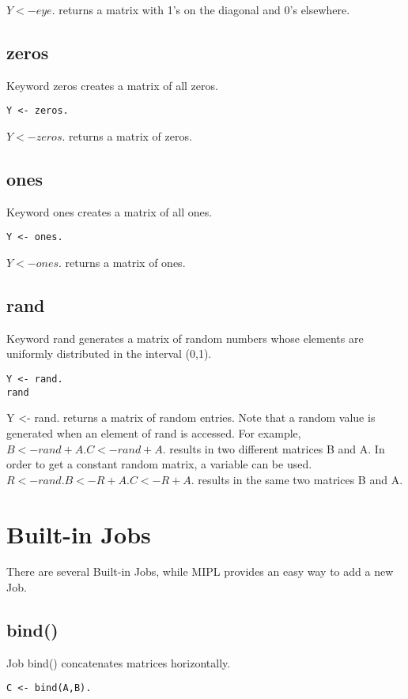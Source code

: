 \documentclass[prodmode,acmtecs]{acmsmall}
\begin{document}
$Y <- eye.$ returns a matrix with 1's on the diagonal and 0's elsewhere.
\medskip

\subsection{zeros}
Keyword zeros creates a matrix of all zeros.
\begin{lstlisting}
Y <- zeros.
\end{lstlisting}

$Y <- zeros.$ returns a matrix of zeros.
\medskip

\subsection{ones}
Keyword ones creates a matrix of all ones.
\begin{lstlisting}
Y <- ones.
\end{lstlisting}

$Y <- ones.$ returns a matrix of ones.
\medskip

\subsection{rand}
Keyword rand generates a matrix of random numbers whose elements are
uniformly distributed in the interval (0,1).
\begin{lstlisting}
Y <- rand.
rand
\end{lstlisting}

Y <- rand. returns a matrix of random entries. Note that a random value
is generated when an element of rand is accessed. For example,
$B <- rand + A. C <- rand + A.$ results in two different matrices B and A.
In order to get a constant random matrix, a variable can be used.
$R <- rand. B <- R + A. C <- R + A.$ results in the same two matrices B
and A.


\section{Built-in Jobs}
There are several Built-in Jobs, while MIPL provides an easy way
to add a new Job.
\medskip

\subsection{bind()}
Job bind() concatenates matrices horizontally.
\begin{lstlisting}
C <- bind(A,B).
\end{lstlisting}
\end{document}
